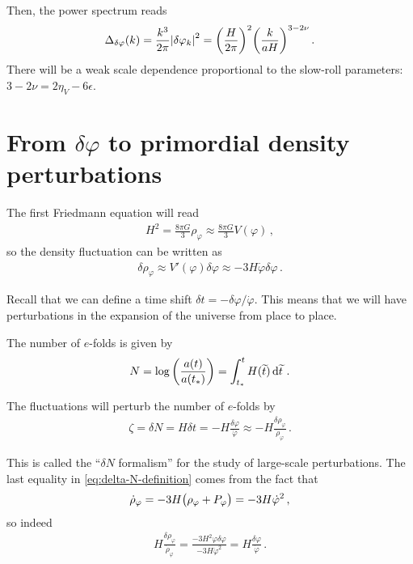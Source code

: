 \documentclass[main.tex]{subfiles}
\begin{document}
Then, the power spectrum reads 
%
\begin{align}
\Delta_{ \delta \varphi }(k) = \frac{k^3}{2 \pi } \abs{ \delta \varphi _k}^2 = \qty( \frac{H}{2 \pi })^2 \qty( \frac{k}{aH})^{3-2\nu }
\,.
\end{align}
%
There will be a weak scale dependence proportional to the slow-roll parameters: \(3 - 2 \nu = 2 \eta _V - 6 \epsilon \).

\section{From \(\delta \varphi \) to primordial density perturbations}

The first Friedmann equation will read 
%
\begin{align}
H^2 = \frac{8 \pi G}{3} \rho_\varphi  \approx \frac{8 \pi G}{3} V(\varphi )
\,,
\end{align}
%
so the density fluctuation can be written as 
%
\begin{align}
\delta \rho _\varphi \approx V' (\varphi ) \delta \varphi \approx - 3 H \dot{\varphi} \delta \varphi 
\,.
\end{align}

Recall that we can define a time shift \(\delta t = - \delta \varphi / \dot{\varphi} \).
This means that we will have perturbations in the expansion of the universe from place to place.

The number of \(e\)-folds is given by 
%
\begin{align}
N = \log \qty( \frac{a(t)}{a (t_*)}) = \int_{t_*}^{t} H(\widetilde{t}) \dd{\widetilde{t}}
\,.
\end{align}

The fluctuations will perturb the number of \(e\)-folds by 
%
\begin{align} \label{eq:delta-N-definition}
\zeta = 
\delta N = H \delta t = - H \frac{ \delta \varphi }{\dot{\varphi}} \approx - H \frac{ \delta \rho _\varphi }{ \dot{\rho}_\varphi }
\,.
\end{align}

This is called the ``\(\delta N\) formalism'' for the study of large-scale perturbations.
The last equality in \eqref{eq:delta-N-definition} comes from the fact that 
%
\begin{align}
\dot{\rho}_\varphi = - 3H \qty(\rho _\varphi + P_\varphi ) = - 3 H \dot{\varphi}^2
\,,
\end{align}
%
so indeed 
%
\begin{align}
H \frac{ \delta \rho _\varphi }{\dot{\rho}_\varphi } = \frac{- 3 H^2 \varphi  \delta \varphi }{-3 H \dot{\varphi}^2} = H \frac{ \delta \varphi }{\dot{\varphi}}
\,.
\end{align}
\end{document}
